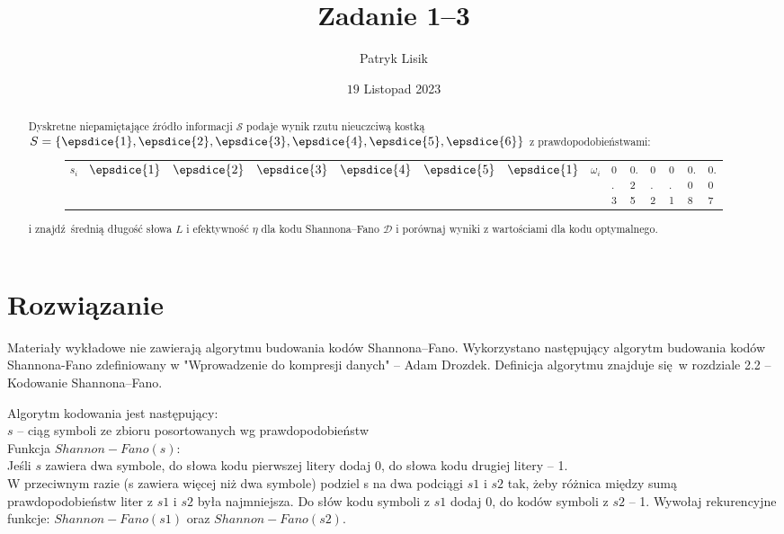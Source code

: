 \documentclass[12pt]{article}
\title{Zadanie 1--3}
\author{Patryk Lisik}
\date{\(19\) Listopad  2023}
\begin{document}
\maketitle
\renewcommand{\abstractname}{Treść}

\begin{abstract}
    Dyskretne niepamiętające źródło informacji $\mathcal{S}$ podaje wynik rzutu nieuczciwą kostką 
    $S = \{ \epsdice{1}, \epsdice{2}, \epsdice{3}, \epsdice{4}, \epsdice{5}, \epsdice{6} \}$ 
    z prawdopodobieństwami:
    \begin{figure}[h]
\centering
\begin{tabular}{ccccccc}
    $s_i$ & $\epsdice{1}$ & $\epsdice{2}$ & $\epsdice{3}$   & $\epsdice{4}$ & $\epsdice{5}$ & $\epsdice{1}$  &\hline
    $\omega_i$      & 0.3  & 0.25 & 0.2 & 0.1 & 0.08 & 0.07 &
\end{tabular}
\label{tab:codes}

\end{figure}

    i znajdź średnią długość słowa $L$ i efektywność $\eta$ dla kodu Shannona--Fano $\mathcal{D}$ i porównaj wyniki z wartościami dla kodu optymalnego.
\end{abstract}


\section*{Rozwiązanie}
Materiały wykładowe nie zawierają algorytmu budowania kodów Shannona--Fano. Wykorzystano następujący algorytm budowania kodów Shannona-Fano zdefiniowany w "Wprowadzenie do kompresji danych" -- Adam Drozdek.
Definicja algorytmu znajduje się w rozdziale 2.2 -- Kodowanie Shannona--Fano.

Algorytm kodowania jest następujący:\\
$s$ – ciąg symboli ze zbioru posortowanych wg prawdopodobieństw\\ 
Funkcja $Shannon-Fano(s)$: \\
Jeśli $s$ zawiera dwa symbole, do słowa kodu pierwszej litery dodaj 0, do słowa kodu drugiej litery – 1.\\
W przeciwnym razie (s zawiera więcej niż dwa symbole) podziel s na dwa podciągi $s1$ i $s2$ tak, 
żeby różnica między sumą prawdopodobieństw liter z $s1$ i $s2$ była najmniejsza.
Do słów kodu symboli z $s1$ dodaj 0, do kodów symboli z $s2$ – 1.
Wywołaj rekurencyjne funkcje: $Shannon-Fano(s1)$ oraz $Shannon-Fano(s2)$.
\end{document}
